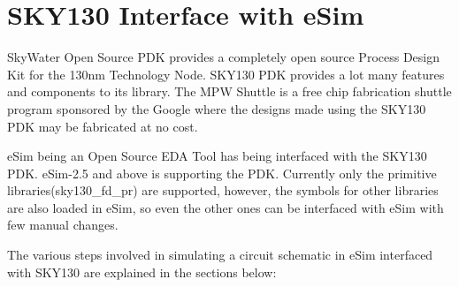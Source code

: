 \chapter{SKY130 Interface with eSim}
\label{chap9}
\thispagestyle{empty}

SkyWater Open Source PDK provides a completely open source Process Design Kit for the 130nm Technology Node. SKY130 PDK provides a lot many features and components to its library. The MPW Shuttle is a free chip fabrication shuttle program sponsored by the Google where the designs made using the SKY130 PDK may be fabricated at no cost.

eSim being an Open Source EDA Tool has being interfaced with the SKY130 PDK. eSim-2.5 and above is supporting the PDK. Currently only the primitive libraries(sky130\_fd\_pr) are supported, however, the symbols for other libraries are also loaded in eSim, so even the other ones can be interfaced with eSim with few manual changes.

The various steps involved in simulating a circuit schematic in eSim interfaced with SKY130 are explained in the sections below:
